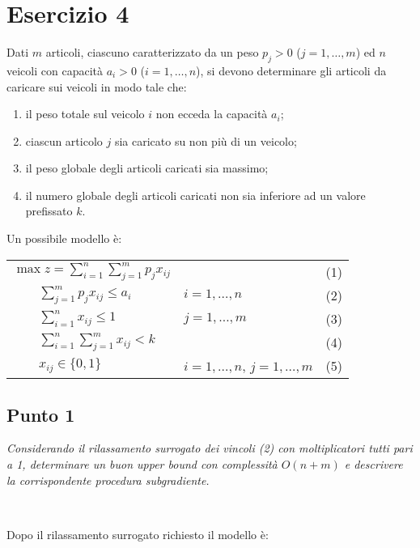 \documentclass[11pt]{book}
\begin{document}
\chapter*{Esercizio 4}

Dati $m$ articoli, ciascuno caratterizzato da un peso $p_j > 0$
($j=1,\dots,m$) ed $n$ veicoli con capacit\`a $a_i>0$ ($i=1,\dots,n$),
si devono determinare gli articoli da caricare sui veicoli in modo
tale che:

\begin{enumerate}
\item il peso totale sul veicolo $i$ non ecceda la capacit\`a $a_i$;
\item ciascun articolo $j$ sia caricato su non pi\`u di un veicolo;
\item il peso globale degli articoli caricati sia massimo;
\item il numero globale degli articoli caricati non sia inferiore ad
  un valore prefissato $k$.
\end{enumerate}

Un possibile modello \`e: 

\begin{center}
\begin{tabular}{lll}
$\max z = \sum\limits_{i=1}^n \sum\limits_{j=1}^m p_j x_{ij}$ & & (1)\\
$\qquad \sum\limits_{j=1}^m p_j x_{ij} \leq a_i$ & $i=1,\dots,n$ & (2) \\
$\qquad \sum\limits_{i=1}^n x_{ij} \leq 1$ & $j=1,\dots,m$ & (3) \\
$\qquad \sum\limits_{i=1}^n\sum\limits_{j=1}^m x_{ij} < k$ & & (4) \\
$\qquad x_{ij} \in \{0, 1 \}$ & $i=1,\dots,n$, $j=1,\dots,m$ & (5) \\
\end{tabular}
\end{center}

\section*{Punto 1}

\textit{Considerando il rilassamento surrogato dei vincoli (2) con
  moltiplicatori tutti pari a 1, determinare un buon upper bound con
  complessit\`a $O(n+m)$ e descrivere la corrispondente procedura
  subgradiente.}

\

Dopo il rilassamento surrogato richiesto il modello \`e:
\end{document}
